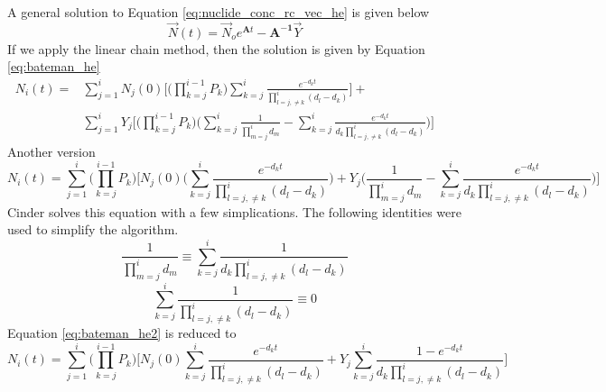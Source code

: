 A general solution to Equation \ref{eq:nuclide_conc_rc_vec_he} is given below
\begin{equation}\label{eq:rate_change_sol_he}
  \vec{N}(t) =\vec{N}_{o} e^{\boldsymbol{A}t }- \boldsymbol{A^{-1}} \vec{Y}
\end{equation}
If we apply the linear chain method, then the solution is given by Equation
\ref{eq:bateman_he}
\begin{equation}\label{eq:bateman_he}
  \begin{aligned}
  N_{i}(t) = &\sum_{j=1}^{i} N_{j}(0)
  \Bigg[ \Bigg( \prod_{k=j}^{i-1} P_{k} \Bigg)
  \sum_{k=j}^{i}\frac{e^{-d_{k}t}}{\displaystyle \prod_{l=j, \neq k}^{i}
  (d_{l} -d_{k})}
  \Bigg] + &&\\
  &\sum_{j=1}^{i} Y_{j} \Bigg[ \Bigg(\prod_{k=j}^{i-1} P_{k} \Bigg)
  \Bigg(\sum_{k=j}^{i} \frac{1}{\displaystyle \prod_{m=j}^{i} d_{m}} -
  \sum_{k=j}^{i} \frac{e^{-d_{k}t}}{d_{k} \displaystyle \prod_{l=j, \neq k}^{i}(d_{l} -d_{k})}
  \Bigg)\Bigg]
  \end{aligned}
\end{equation}
Another version
\begin{equation}\label{eq:bateman_he_2}
  N_{i}(t) = \sum_{j=1}^{i}
  \Bigg( \prod_{k=j}^{i-1} P_{k} \Bigg)
  \Bigg[ N_{j}(0) \Bigg(\sum_{k=j}^{i}\frac{e^{-d_{k}t}}{\displaystyle
  \prod_{l=j, \neq k}^{i}(d_{l} -d_{k})}
  \Bigg) + Y_{j}
  \Bigg( \frac{1}{\displaystyle \prod_{m=j}^{i} d_{m}} -
  \sum_{k=j}^{i} \frac{e^{-d_{k}t}}{d_{k}
  \displaystyle \prod_{l=j, \neq k}^{i}(d_{l} -d_{k})}
  \Bigg)\Bigg]
\end{equation}
Cinder solves this equation with a few simplications. The following identities were used to
simplify the algorithm.
\begin{equation}\label{eq:simplification1}
  \frac{1}{\displaystyle \prod_{m=j}^{i} d_{m}} \equiv
  \sum_{k=j}^{i} \frac{1}{d_{k}
  \displaystyle \prod_{ l=j, \neq k}^{i}(d_{l} -d_{k})}
\end{equation}
\begin{equation}\label{eq:simplification2}
  \sum_{k=j}^{i} \frac{1}{
  \displaystyle \prod_{l=j, \neq k}^{i}(d_{l} -d_{k})} \equiv 0
\end{equation}
Equation \ref{eq:bateman_he2} is reduced to
\begin{equation}\label{eq:bateman_he_simp}
  N_{i}(t) = \sum_{j=1}^{i}
  \Bigg( \prod_{k=j}^{i-1} P_{k} \Bigg)
  \Bigg[ N_{j}(0) \sum_{k=j}^{i}\frac{e^{-d_{k}t}}{\displaystyle
  \prod_{l=j, \neq k}^{i}(d_{l} -d_{k})}
  + Y_{j}
  \sum_{k=j}^{i} \frac{1 - e^{-d_{k}t}}{d_{k}
  \displaystyle \prod_{l=j, \neq k}^{i}(d_{l} -d_{k})}
  \Bigg]
\end{equation}
